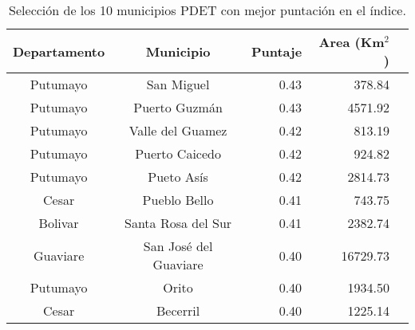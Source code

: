 \begin{table}\label{tab:top}
\centering
\begin{tabular}{ c c r r r } \hline
Departamento & Municipio & Puntaje & Area (Km$^2$) \\ \hline
Putumayo &	San Miguel &	0.43 &	378.84 \\
Putumayo &	Puerto Guzmán	& 0.43	& 4571.92 \\
Putumayo &	Valle del Guamez &	0.42	& 813.19 \\
Putumayo &	Puerto Caicedo & 	0.42	&  924.82 \\
Putumayo &	Pueto Asís & 	0.42	& 2814.73 \\
Cesar &	    Pueblo Bello &	0.41	& 743.75 \\
Bolivar &	    Santa Rosa del Sur &	0.41	& 2382.74 \\
Guaviare &	San José del Guaviare &	0.40	& 16729.73 \\
Putumayo &	Orito &	0.40	& 1934.50 \\
Cesar &	    Becerril & 	0.40	& 1225.14 \\ \hline
\end{tabular}
\caption{Selección de los 10 municipios PDET con mejor puntación en el índice.}
\end{table} 
